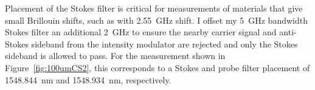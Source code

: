 Placement of the Stokes filter is critical for measurements of materials that give small Brillouin shifts, such as with  \SI{2.55}{\giga\hertz} shift. I offset my \SI{5}{\giga\hertz} bandwidth Stokes filter an additional \SI{2}{\giga\hertz} to ensure the nearby carrier signal and anti-Stokes sideband from the intensity modulator are rejected and only the Stokes sideband is allowed to pass. For the measurement shown in Figure~\ref{fig:100umCS2}, this corresponds to a Stokes and probe filter placement of \SI{1548.844}{\nano\meter} and \SI{1548.934}{\nano\meter}, respectively.

%
%
%
%
%

